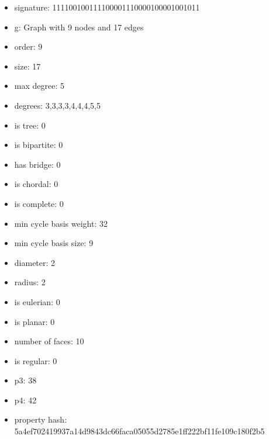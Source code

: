 \newpage
\begin{figure}
\end{figure}
\begin{itemize}
\item signature: 111100100111100001110000100001001011
\item g: Graph with 9 nodes and 17 edges
\item order: 9
\item size: 17
\item max degree: 5
\item degrees: 3,3,3,3,4,4,4,5,5
\item is tree: 0
\item is bipartite: 0
\item has bridge: 0
\item is chordal: 0
\item is complete: 0
\item min cycle basis weight: 32
\item min cycle basis size: 9
\item diameter: 2
\item radius: 2
\item is eulerian: 0
\item is planar: 0
\item number of faces: 10
\item is regular: 0
\item p3: 38
\item p4: 42
\item property hash: 5a4ef702419937a14d9843dc66faca05055d2785e1ff222bf11fe109c180f2b5
\end{itemize}
